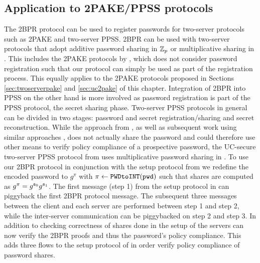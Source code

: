 \subsection{Application to 2PAKE/PPSS protocols}
The \ac{2BPR} protocol can be used to register passwords for two-server protocols such as \ac{2PAKE} and two-server \ac{PPSS}.
\ac{2BPR} can be used with two-server protocols that adopt additive password sharing in $\mathbb{Z}_p$ or multiplicative sharing in \GG.
This includes the \ac{2PAKE} protocols by \citet{Katz2012a}, which does not consider password registration such that our protocol can simply be used as part of the registration process.
This equally applies to the \ac{2PAKE} protocols proposed in Sections \ref{sec:twoserverpake} and \ref{sec:uc2pake} of this chapter.
Integration of \ac{2BPR} into \ac{PPSS} on the other hand is more involved as password registration is part of the \ac{PPSS} protocol, \ie the secret sharing phase.
Two-server \ac{PPSS} protocols in general can be divided in two stages: password and secret registration/sharing and secret reconstruction.
While the approach from \citet{Bagherzandi2011}, as well as subsequent work using similar approaches \cite{PryvalovK14,CamenischLLN14,JareckiKK14}, does not actually share the password and could therefore use other means to verify policy compliance of a prospective password, the \ac{UC}-secure two-server \ac{PPSS} protocol from \citet{Camenisch2012} uses multiplicative password sharing in \GG.
To use our \ac{2BPR} protocol in conjunction with the setup protocol from \citet{Camenisch2012} we redefine the encoded password to $g^{\pi}$ with $\pi\gets\texttt{PWDtoINT}(\mathtt{pwd})$ such that shares are computed as $g^{\pi}=g^{\mathfrak{s}_0}g^{\mathfrak{s}_1}$.
The first message (step 1) from the setup protocol in \cite[Figure 4]{Camenisch2012} can piggyback the first \ac{2BPR} protocol message.
The subsequent three messages between the client and each server are performed between step 1 and step 2, while the inter-server communication can be piggybacked on step 2 and step 3.
In addition to checking correctness of shares done in the setup of \cite{Camenisch2012} the servers can now verify the \ac{2BPR} proofs and thus the password's policy compliance.
This adds three flows to the setup protocol of \cite{Camenisch2012} in order verify policy compliance of password shares.
